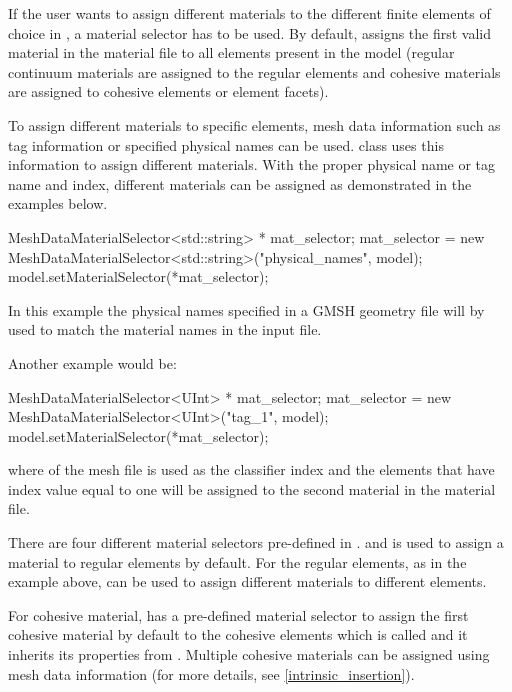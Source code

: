 If the user wants to assign different materials to the different
finite elements of choice in \akantu, a material selector has to be
used. By default, \akantu assigns the first valid material in the
material file to all elements present in the model (regular continuum
materials are assigned to the regular elements and cohesive materials
are assigned to cohesive elements or element facets).

To assign different materials to specific elements, mesh data
information such as tag information or specified physical names can be
used.  class uses this information to
assign different materials. With the proper physical name or tag name
and index, different materials can be assigned as demonstrated in the
examples below.

\begin{cpp}
  MeshDataMaterialSelector<std::string> * mat_selector;
  mat_selector = new MeshDataMaterialSelector<std::string>("physical_names", model);
  model.setMaterialSelector(*mat_selector);
\end{cpp}

In this example the physical names specified in a GMSH geometry file will by
used to match the material names in the input file.

Another example would be:

\begin{cpp}
  MeshDataMaterialSelector<UInt> * mat_selector;
  mat_selector = new MeshDataMaterialSelector<UInt>("tag_1", model);
  model.setMaterialSelector(*mat_selector);
\end{cpp}

where  of the mesh file is used as the classifier index
and the elements that have index value equal to one will be assigned
to the second material in the material file.

There are four different material selectors pre-defined in
\akantu.  and  is
used to assign a material to regular elements by default. For the
regular elements, as in the example above,
 can be used to assign different
materials to different elements. 

For cohesive material, \akantu has a pre-defined material selector to assign 
the first cohesive material by default to the cohesive elements which is called 
 and it inherits its properties from 
. Multiple cohesive materials can be assigned 
using mesh data information (for more details, see \ref{intrinsic_insertion}).

